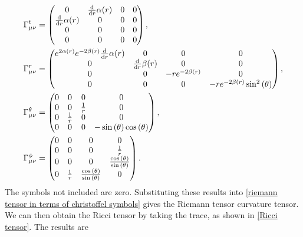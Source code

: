 \begin{align}
    \Gamma^t_{\mu \nu}
    & =
    \left(
        \begin{matrix}
            0 & \odv{}{r} \alpha{\left(r \right)} & 0 & 0\\\odv{}{r} \alpha{\left(r \right)} & 0 & 0 & 0\\0 & 0 & 0 & 0\\0 & 0 & 0 & 0
        \end{matrix}
    \right), \\
    \Gamma^r_{\mu \nu}
    &=
    \left(
        \begin{matrix}
            e^{2 \alpha{\left(r \right)}} e^{- 2 \beta{\left(r \right)}} \odv{}{r} \alpha{\left(r \right)} & 0 & 0 & 0\\0 & \odv{}{r} \beta{\left(r \right)} & 0 & 0\\0 & 0 & - r e^{- 2 \beta{\left(r \right)}} & 0\\0 & 0 & 0 & - r e^{- 2 \beta{\left(r \right)}} \sin^{2}{\left(\theta \right)}
        \end{matrix}
     \right), \\
     \Gamma^\theta_{\mu \nu} 
     & =
     \left(
         \begin{matrix}
            0 & 0 & 0 & 0\\0 & 0 & \frac{1}{r} & 0\\0 & \frac{1}{r} & 0 & 0\\0 & 0 & 0 & - \sin{\left(\theta \right)} \cos{\left(\theta \right)}
        \end{matrix}
    \right), \\
    \Gamma^\phi_{\mu \nu} 
    &=
    \left(
        \begin{matrix}
            0 & 0 & 0 & 0\\0 & 0 & 0 & \frac{1}{r}\\0 & 0 & 0 & \frac{\cos{\left(\theta \right)}}{\sin{\left(\theta \right)}}\\0 & \frac{1}{r} & \frac{\cos{\left(\theta \right)}}{\sin{\left(\theta \right)}} & 0
        \end{matrix}
    \right).
\end{align}
%
The symbols not included are zero.
Substituting these results into \autoref{riemann tensor in terms of christoffel symbols} gives the Riemann tensor curvature tensor.
We can then obtain the Ricci tensor by taking the trace, as shown in \autoref{Ricci tensor}.
The results are
%
